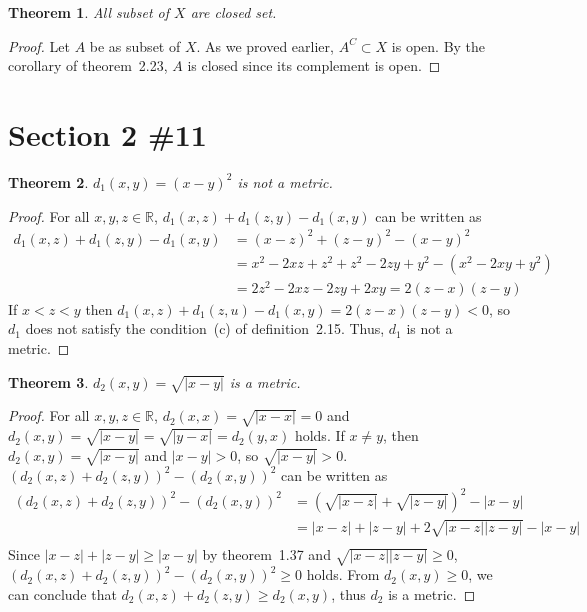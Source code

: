 \documentclass{scrartcl}
\newtheorem{theorem}{Theorem}
\begin{document}
\begin{theorem}
  All subset of \(X\) are closed set.
\end{theorem}
\begin{proof}
  Let \(A\) be as subset of \(X\).
  As we proved earlier, \(A^C \subset X\) is open.
  By the corollary of theorem~2.23, \(A\) is closed since its complement is open.
\end{proof}

\section{Section 2 \#11}
\begin{theorem}
  \(d_1(x, y) = (x - y)^2\) is not a metric.
\end{theorem}
\begin{proof}
  For all \(x, y, z \in \mathbb{R}\), \(d_1(x, z) + d_1(z, y) - d_1(x, y)\) can be written as
  \begin{align*}
    d_1(x, z) + d_1(z, y) - d_1(x, y) &= (x - z)^2 + (z - y)^2 - (x - y)^2 \\
                                      &= x^2 - 2xz + z^2 + z^2 - 2zy + y^2 - (x^2 - 2xy + y^2) \\
                                      &= 2z^2 - 2xz - 2zy + 2xy = 2(z - x)(z - y)
  \end{align*}
  If \(x < z < y\) then \(d_1(x, z) + d_1(z, u) - d_1(x, y) = 2(z - x)(z - y) < 0\), so \(d_1\) does not satisfy the condition~(c) of definition~2.15.
  Thus, \(d_1\) is not a metric.
\end{proof}

\begin{theorem}
  \(d_2(x, y) = \sqrt{|x - y|}\) is a metric.
\end{theorem}
\begin{proof}
  For all \(x, y, z \in \mathbb{R}\), \(d_2(x, x) = \sqrt{|x - x|} = 0\) and \(d_2(x, y) = \sqrt{|x - y|} = \sqrt{|y - x|} = d_2(y, x)\) holds.
  If \(x \not = y\), then \(d_2(x, y) = \sqrt{|x - y|}\) and \(|x - y| > 0\), so \(\sqrt{|x - y|} > 0\).
  \((d_2(x, z) + d_2(z, y))^2 - (d_2(x, y))^2\) can be written as
  \begin{align*}
    (d_2(x, z) + d_2(z, y))^2 - (d_2(x, y))^2 &= \left(\sqrt{|x - z|} + \sqrt{|z - y|}\right)^2 - |x - y| \\
                                              &= |x - z| + |z - y| + 2\sqrt{|x - z||z - y|} - |x - y| \\
  \end{align*}
  Since \(|x - z| + |z - y| \geq |x - y|\) by theorem~1.37 and \(\sqrt{|x - z||z - y|} \geq 0\), \((d_2(x, z) + d_2(z, y))^2 - (d_2(x, y))^2 \geq 0\) holds.
  From \(d_2(x, y) \geq 0\), we can conclude that \(d_2(x, z) + d_2(z, y) \geq d_2(x, y)\), thus \(d_2\) is a metric.
\end{proof}
\end{document}
